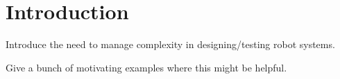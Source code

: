 
\section{Introduction}

Introduce the need to manage complexity in designing/testing robot systems.

Give a bunch of motivating examples where this might be helpful.
